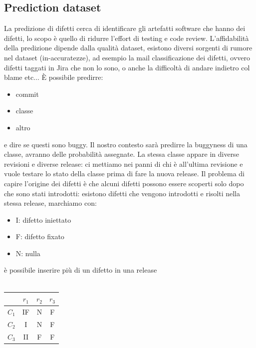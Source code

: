 \documentclass{article}
\begin{document}
\subsection{Prediction dataset}
La predizione di difetti cerca di identificare gli artefatti software che hanno dei difetti, lo scopo è quello di ridurre l'effort di testing e code review. L'affidabilità della predizione dipende dalla qualità dataset, esistono diversi sorgenti di rumore nel dataset (in-accuratezze), ad esempio la mail classificazione dei difetti, ovvero difetti taggati in Jira che non lo sono, o anche la difficoltà di andare indietro col blame etc... È possibile predirre:
\begin{itemize}
\item commit
\item classe
\item altro
\end{itemize}
e dire se questi sono buggy. Il nostro contesto sarà predirre la buggyness di una classe, avranno delle probabilità assegnate. La stessa classe appare in diverse revisioni e diverse release: ci mettiamo nei panni di chi è all'ultima revisione e vuole testare lo stato della classe prima di fare la nuova release. Il problema di capire l'origine dei difetti è che alcuni difetti possono essere scoperti solo dopo che sono stati introdotti: esistono difetti che vengono introdotti e risolti nella stessa release, marchiamo con:
\begin{itemize}
\item I: difetto iniettato
\item F: difetto fixato
\item N: nulla
\end{itemize}
è possibile inserire più di un difetto in una release\\\\
\begin{tabular}{ |c|c|c|c|}
\hline
 & $r_1$ & $r_2$ & $r_3$\\
\hline
$C_1$ & IF & N & F\\
\hline
$C_2$ & I & N & F\\
\hline
$C_3$ & II & F & F\\
\hline
\end{tabular}\\\\
\end{document}
